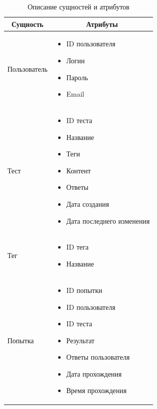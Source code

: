 \begin{table}[h!]
    \begin{center}
        \begin{tabular}{|l|p{6.5cm}|}
            \hline
            \multicolumn{1}{|c|}{\textbf{Сущность}} & \multicolumn{1}{c|}{\textbf{Атрибуты}} \\ \hline
            Пользователь & \begin{itemize}
                \item ID пользователя
                \item Логин
                \item Пароль
                \item Email
            \end{itemize} \\ \hline
            Тест & \begin{itemize}
                \item ID теста
                \item Название
                \item Теги
                \item Контент
                \item Ответы
                \item Дата создания
                \item Дата последнего изменения
            \end{itemize} \\ \hline
            Тег & \begin{itemize}
                \item ID тега
                \item Название
            \end{itemize}
            \\ \hline
            Попытка & \begin{itemize}
                \item ID попытки
                \item ID пользователя
                \item ID теста
                \item Результат
                \item Ответы пользователя
                \item Дата прохождения
                \item Время прохождения
            \end{itemize}
            \\ \hline
        \end{tabular}
    \end{center}
    \caption{Описание сущностей и атрибутов}
\end{table}

